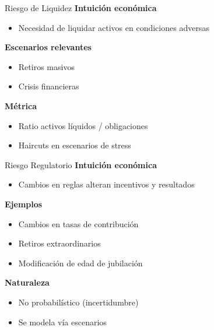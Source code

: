 \documentclass{beamer}
\begin{document}
\begin{frame}{Riesgo de Liquidez}
\textbf{Intuición económica}
\begin{itemize}
\item Necesidad de liquidar activos en condiciones adversas
\end{itemize}

\vspace{0.3cm}
\textbf{Escenarios relevantes}
\begin{itemize}
\item Retiros masivos
\item Crisis financieras
\end{itemize}

\vspace{0.3cm}
\textbf{Métrica}
\begin{itemize}
\item Ratio activos líquidos / obligaciones
\item Haircuts en escenarios de stress
\end{itemize}
\end{frame}

\begin{frame}{Riesgo Regulatorio}
\textbf{Intuición económica}
\begin{itemize}
\item Cambios en reglas alteran incentivos y resultados
\end{itemize}

\vspace{0.3cm}
\textbf{Ejemplos}
\begin{itemize}
\item Cambios en tasas de contribución
\item Retiros extraordinarios
\item Modificación de edad de jubilación
\end{itemize}

\vspace{0.3cm}
\textbf{Naturaleza}
\begin{itemize}
\item No probabilístico (incertidumbre)
\item Se modela vía escenarios
\end{itemize}
\end{frame}
\end{document}
